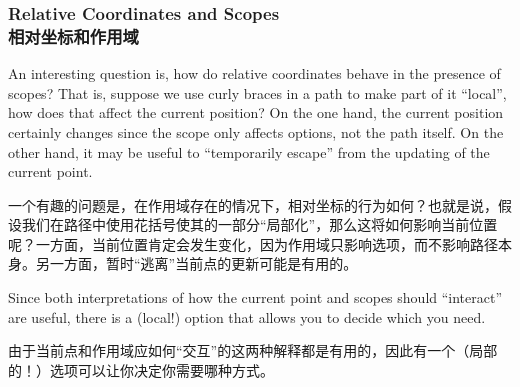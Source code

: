 \subsubsection{Relative Coordinates and Scopes\\相对坐标和作用域}
\label{section-scopes-relative}

An interesting question is, how do relative coordinates behave in the presence
of scopes? That is, suppose we use curly braces in a path to make part of it
``local'', how does that affect the current position? On the one hand, the
current position certainly changes since the scope only affects options, not
the path itself. On the other hand, it may be useful to ``temporarily escape''
from the updating of the current point.

一个有趣的问题是，在作用域存在的情况下，相对坐标的行为如何？也就是说，假设我们在路径中使用花括号使其的一部分“局部化”，那么这将如何影响当前位置呢？一方面，当前位置肯定会发生变化，因为作用域只影响选项，而不影响路径本身。另一方面，暂时“逃离”当前点的更新可能是有用的。


Since both interpretations of how the current point and scopes should
``interact'' are useful, there is a (local!) option that allows you to decide
which you need.

由于当前点和作用域应如何“交互”的这两种解释都是有用的，因此有一个（局部的！）选项可以让你决定你需要哪种方式。


